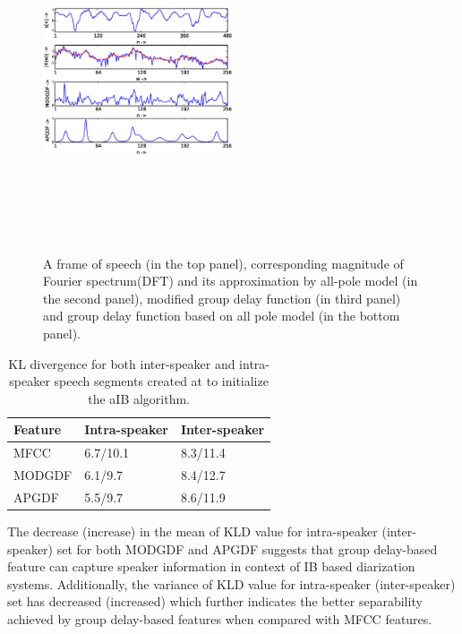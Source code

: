 \documentclass[conference]{IEEEtran}
\begin{document}
\begin{figure}[h]
\centering
\includegraphics[width=0.5\textwidth,height=10cm]{figures/apSpectrum.eps}
\caption{ A frame of speech (in the top panel), corresponding magnitude of
Fourier spectrum(DFT) and its approximation by all-pole model (in the second
panel), modified group delay function (in third panel) and group delay function 
based on all pole model (in the bottom panel).}
\label{fig:all-pole}
\end{figure}


\begin{table}[h]
\centering

\label{table:kl-div}
\begin{tabular}{|l|l|l|}
\hline
Feature 			& Intra-speaker 			& Inter-speaker 	 \\ \hline
MFCC          			& 6.7/10.1               & 8.3/11.4       \\ \hline
MODGDF        			& 6.1/9.7                & 8.4/12.7       \\ \hline
APGDF         			& 5.5/9.7                & 8.6/11.9        \\ \hline
\end{tabular}

\vspace{0.4cm}
\caption{KL divergence for both inter-speaker and intra-speaker speech segments
created at to initialize the aIB algorithm.}
\end{table}

The decrease (increase) in the mean of KLD value for intra-speaker
(inter-speaker) set for both MODGDF and APGDF suggests that group delay-based
feature can capture speaker information in context of IB based diarization
systems. Additionally, the variance of KLD value for intra-speaker
(inter-speaker) set has decreased (increased) which further indicates the better
separability achieved by group delay-based features when compared with MFCC
features. 
\end{document}
